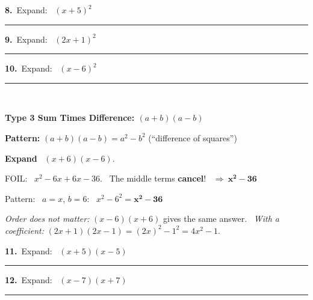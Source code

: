 \documentclass[11pt,letterpaper]{article}
\newcommand{\topicbar}[1]{\needspace{4.5cm}\par\vspace{5mm}
  \begin{tcolorbox}[enhanced,colback=fmtitle,colframe=fmtitle,arc=2mm,left=4mm,top=1.5mm,bottom=1.5mm]
  \color{white}\bfseries\large #1
  \end{tcolorbox}}
\begin{document}
\needspace{2.4cm}\par\vspace{3mm}\noindent\begin{minipage}[t]{0.48\linewidth}{\color{fmturn}\bfseries 8.}\ Expand: \ $(x + 5)^2$\par\vspace{1.4cm}\hfill\rule{4.2cm}{0.4pt}\end{minipage}\hfill\begin{minipage}[t]{0.48\linewidth}{\color{fmturn}\bfseries 9.}\ Expand: \ $(2x + 1)^2$\par\vspace{1.4cm}\hfill\rule{4.2cm}{0.4pt}\end{minipage}\par
\needspace{2.4cm}\par\vspace{3mm}\noindent\begin{minipage}[t]{0.48\linewidth}{\color{fmturn}\bfseries 10.}\ Expand: \ $(x - 6)^2$\par\vspace{1.4cm}\hfill\rule{4.2cm}{0.4pt}\end{minipage}\hfill\begin{minipage}[t]{0.48\linewidth}\ \end{minipage}\par
\needspace{9cm}\topicbar{Type 3 \quad Sum Times Difference: $(a+b)(a-b)$}
\begin{watchme}\textbf{Pattern:} \quad $(a + b)(a - b) = a^2 - b^2$ \quad (``difference of squares'')\par\vspace{2mm}
\textbf{Expand} \ $(x + 6)(x - 6)$.\par
\quad FOIL: \ $x^2 - 6x + 6x - 36$. \ The middle terms \textbf{cancel}! \ $\Rightarrow \ \boldsymbol{x^2 - 36}$\par
\quad Pattern: \ $a = x$, $b = 6$: \ $x^2 - 6^2 = \boldsymbol{x^2 - 36}$\par\vspace{1mm}
\textit{Order does not matter:} $(x - 6)(x + 6)$ gives the same answer. \ \textit{With a coefficient:} $(2x + 1)(2x - 1) = (2x)^2 - 1^2 = 4x^2 - 1$.\end{watchme}
\needspace{2.2cm}\par\vspace{3mm}\noindent\begin{minipage}[t]{0.48\linewidth}{\color{fmturn}\bfseries 11.}\ Expand: \ $(x + 5)(x - 5)$\par\vspace{1.2cm}\hfill\rule{4.2cm}{0.4pt}\end{minipage}\hfill\begin{minipage}[t]{0.48\linewidth}{\color{fmturn}\bfseries 12.}\ Expand: \ $(x - 7)(x + 7)$\par\vspace{1.2cm}\hfill\rule{4.2cm}{0.4pt}\end{minipage}\par
\end{document}
